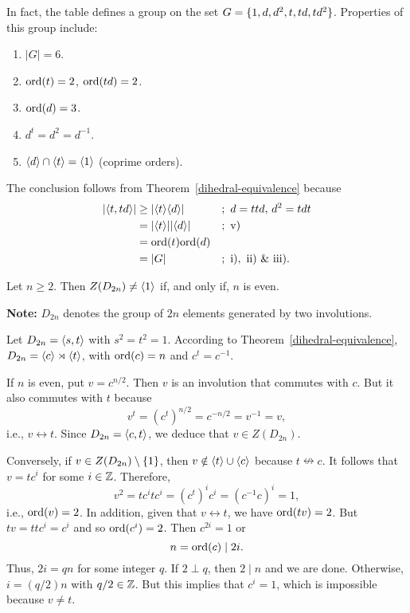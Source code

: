 \begin{solution}
\begin{solution}
    In fact, the table defines a group on the set\/ $G=\{1, d, d^2, t, td, td^2\}$. Properties of this group include:
    \begin{enumerate}[\rm i)]
        \item $|G|=6$.
        \item ${\rm ord}(t)=2$, ${\rm ord}(td)=2$.
        \item ${\rm ord}(d)=3$.
        \item $d^t=d^2=d^{-1}$.
        \item $\langle d\rangle\cap\langle t\rangle=\langle1\rangle$ (coprime orders).
    \end{enumerate}
    The conclusion follows from Theorem~\ref{dihedral-equivalence} because
        \begin{align*}
            |\gen{t,td}|&\ge|\gen t\gen d|  &&;\ d=ttd,\,d^2=tdt\\
                &=|\gen t||\gen d| &&;\ \rm v)\\
                &= \ord(t)\ord(d)\\
                &= |G|  &&;\ \rm i),\ \rm ii)\ \&\ iii).
        \end{align*}
      \end{solution}    

\begin{exr}\label{exercise-1.6.6}
    Let\/ $n \geq 2$. Then\/ $Z(D_{2n}) \ne\langle1\rangle$ if, and only if, $n$ is even.

    \textrm{\rm\textbf{Note:} $D_{2n}$ denotes the group of $2n$ elements generated by two involutions.}
\end{exr}

\begin{solution} Let $D_{2n}=\langle s,t\rangle$ with $s^2=t^2=1$. According to Theorem~\ref{dihedral-equivalence}, $D_{2n}=\langle c\rangle\rtimes\langle t\rangle$, with ${\rm ord}(c)=n$ and $c^t=c^{-1}$.

If $n$ is even, put $v=c^{n/2}$. Then $v$ is an involution that commutes with $c$. But it also commutes with $t$ because
$$
    v^t = (c^t)^{n/2} = c^{-n/2} = v^{-1} = v,
$$
i.e., $v\leftrightarrow t$. Since $D_{2n}=\langle c,t\rangle$, we deduce that $v\in Z(D_{2n})$.

Conversely, if $v\in Z(D_{2n})\setminus\{1\}$, then $v\notin\langle t\rangle\cup\langle c\rangle$ because $t\nleftrightarrow c$. It follows that $v=tc^i$ for some $i\in\mathbb{Z}$. Therefore,
$$
    v^2 = tc^itc^i=(c^t)^ic^i=(c^{-1}c)^i = 1,
$$
i.e., ${\rm ord}(v)=2$. In addition, given that $v\leftrightarrow t$, we have ${\rm ord}(tv)=2$. But $tv=ttc^i=c^i$ and so ${\rm ord}(c^i)=2$. Then $c^{2i}=1$ or
$$
    n={\rm ord}(c)\mid 2i.
$$
Thus, $2i=qn$ for some integer $q$. If $2\perp q$, then $2\mid n$ and we are done. Otherwise, $i=(q/2)n$ with $q/2\in\mathbb{Z}$. But this implies that $c^i=1$, which is impossible because $v\ne t$.  \end{solution}


\end{solution}
